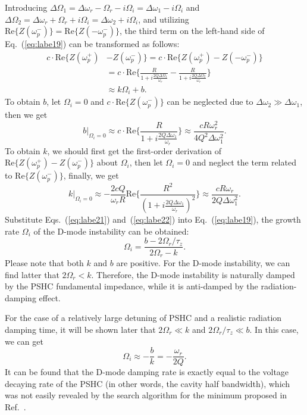 \documentclass[%
 reprint,
 amsmath,amssymb,
 aps,
]{revtex4-1}
\begin{document}
Introducing $\Delta\Omega_1=\Delta\omega_r-\Omega_r-i\Omega_i=\Delta\omega_1-i\Omega_i$ and $\Delta\Omega_2=\Delta\omega_r+\Omega_r+i\Omega_i=\Delta\omega_2+i\Omega_i$, and utilizing $\mathrm {Re}\{Z(\omega^{-}_p)\}=\mathrm {Re}\{Z(-\omega^{-}_p)\}$, the third term on the left-hand side of Eq.~(\ref{eq:labe19}) can be transformed as follows:
\begin{equation}\label{eq:labe20}
   \begin{aligned}
   c \cdot \mathrm {Re}\{Z(\omega^{+}_p)&-Z(\omega^{-}_p)\} =c \cdot \mathrm {Re}\{Z(\omega^{+}_p)-Z(-\omega^{-}_p)\}\\
   &=c \cdot \mathrm {Re}\{\frac{R}{1+i\frac{2Q\Delta\Omega_1}{\omega_r}}-\frac{R}{1+i\frac{2Q\Delta\Omega_2}{\omega_r}}\}\\
   &\approx k\Omega_i+b.
   \end{aligned}
\end{equation}
To obtain $b$, let $\Omega_i=0$ and $c \cdot \mathrm {Re}\{Z(\omega^{-}_p)\}$ can be neglected due to $\Delta\omega_2 \gg \Delta\omega_1$, then we get
\begin{equation}\label{eq:labe21}
   b|_{\Omega_i=0}\approx c \cdot \mathrm {Re} \{\frac{R}{1+i\frac{2Q\Delta\omega_1}{\omega_r}}\} \approx \frac{cR\omega^2_r}{4Q^2\Delta\omega^2_1}.
\end{equation}
To obtain $k$, we should first get the first-order derivation of $\mathrm {Re}\{Z(\omega^{+}_p)-Z(\omega^{-}_p)\}$ about $\Omega_i$, then let $\Omega_i=0$ and neglect the term related to $\mathrm {Re}\{Z(\omega^{-}_p)\}$, finally, we get
\begin{equation}\label{eq:labe22}
   k|_{\Omega_i=0}\approx -\frac{2cQ}{\omega_r R} \mathrm {Re} \{\frac{R^2}{(1+i\frac{2Q\Delta\omega_1}{\omega_r})^2}\} \approx \frac{cR\omega_r}{2Q \Delta\omega^2_1}.
\end{equation}
Substitute Eqs.~(\ref{eq:labe21}) and~(\ref{eq:labe22}) into Eq.~(\ref{eq:labe19}), the growth rate $\Omega_i$ of the D-mode instability can be obtained:
\begin{equation}\label{eq:labe23}
   \Omega_i=\frac{b-2\Omega_r/\tau_z}{2\Omega_r-k}.
\end{equation}
Please note that both $k$ and $b$ are positive. For the D-mode instability, we can find latter that $2\Omega_r<k$. Therefore, the D-mode instability is naturally damped by the PSHC fundamental impedance, while it is anti-damped by the radiation-damping effect. 

For the case of a relatively large detuning of PSHC and a realistic radiation damping time, it will be shown later that $2\Omega_r\ll k$ and $2\Omega_r/\tau_z \ll b$. In this case, we can get
\begin{equation}\label{eq:labe24}
   \Omega_i \approx -\frac{b}{k}=-\frac{\omega_r}{2Q}.
\end{equation}
It can be found that the D-mode damping rate is exactly equal to the voltage decaying rate of the PSHC (in other words, the cavity half bandwidth), which was not easily revealed by the search algorithm for the minimum proposed in Ref.~\cite{He06}.
\end{document}
